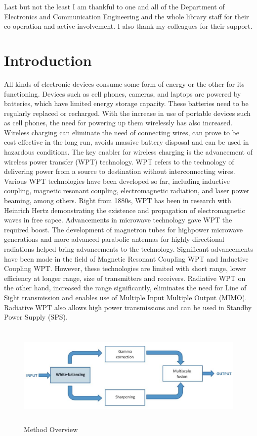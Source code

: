 \documentclass[hidelinks, 12pt]{report}
\begin{document}
Last but not the least I am thankful to one and all of the Department of Electronics and Communication Engineering and the whole library staff for their co-operation and active involvement. I also thank my colleagues for their support.
\hbox{} \newpage 
{} 
\pagestyle{fancy}
\chapter{Introduction}
\justify
All kinds of electronic devices consume some form of energy or the other for its functioning. Devices such as cell phones, cameras, and laptops are powered by batteries, which have limited energy storage capacity. These batteries need to be regularly replaced or recharged. With the increase in use of portable devices such as cell phones, the need for powering up them wirelessly has also increased. Wireless charging can eliminate the need of connecting wires, can prove to be cost effective in the long run, avoids massive battery disposal and can be used in hazardous conditions. The key enabler for wireless charging is the advancement of wireless power transfer (WPT) technology. WPT refers to the technology of delivering power from a source to destination without interconnecting wires. Various WPT technologies have been developed so far, including inductive coupling, magnetic resonant coupling, electromagnetic radiation, and laser power beaming, among others. Right from 1880s, WPT has been in research with Heinrich Hertz demonstrating the existence and propagation of electromagnetic waves in free sapce. Advancements in microwave technology gave WPT the required boost. The development of magnetron tubes for highpower microwave generations and more advanced parabolic antennas for highly directional radiations helped bring advancements to the technology. Significant advancements have been made in the field of Magnetic Resonant Coupling WPT and Inductive Coupling WPT. However, these technologies are limited with short range, lower efficiency at longer range, size of transmitters and receivers. Radiative WPT on the other hand, increased the range significantly, eliminates the need for Line of Sight transmission and enables use of Multiple Input Multiple Output (MIMO). Radiative WPT also allows high power transmissions and can be used in Standby Power Supply (SPS).  
\begin{figure}[H]
\centering
\includegraphics[width=15cm,height=5cm]{Block.png}
\caption[Method Overview]{Method Overview}
\label{Method Overview}
\end{figure}
\end{document}

